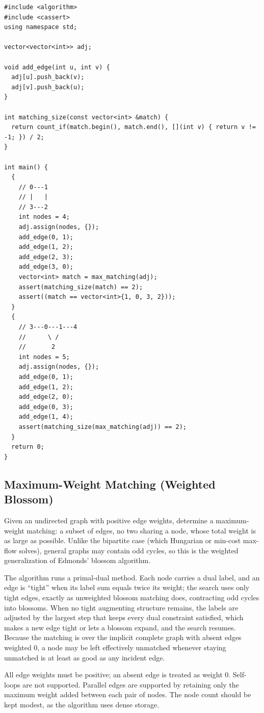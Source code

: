 \begin{lstlisting}[style=cpp]
#include <algorithm>
#include <cassert>
using namespace std;

vector<vector<int>> adj;

void add_edge(int u, int v) {
  adj[u].push_back(v);
  adj[v].push_back(u);
}

int matching_size(const vector<int> &match) {
  return count_if(match.begin(), match.end(), [](int v) { return v != -1; }) / 2;
}

int main() {
  {
    // 0---1
    // |   |
    // 3---2
    int nodes = 4;
    adj.assign(nodes, {});
    add_edge(0, 1);
    add_edge(1, 2);
    add_edge(2, 3);
    add_edge(3, 0);
    vector<int> match = max_matching(adj);
    assert(matching_size(match) == 2);
    assert((match == vector<int>{1, 0, 3, 2}));
  }
  {
    // 3---0---1---4
    //      \ /
    //       2
    int nodes = 5;
    adj.assign(nodes, {});
    add_edge(0, 1);
    add_edge(1, 2);
    add_edge(2, 0);
    add_edge(0, 3);
    add_edge(1, 4);
    assert(matching_size(max_matching(adj)) == 2);
  }
  return 0;
}
\end{lstlisting}
\subsection{Maximum-Weight Matching (Weighted Blossom)}
\label{sec:4.6.6}
Given an undirected graph with positive edge weights, determine a maximum-weight matching: a subset of edges, no two sharing a node, whose total weight is as large as possible. Unlike the bipartite case (which Hungarian or min-cost max-flow solves), general graphs may contain odd cycles, so this is the weighted generalization of Edmonds' blossom algorithm.

The algorithm runs a primal-dual method. Each node carries a dual label, and an edge is ``tight'' when its label sum equals twice its weight; the search uses only tight edges, exactly as unweighted blossom matching does, contracting odd cycles into blossoms. When no tight augmenting structure remains, the labels are adjusted by the largest step that keeps every dual constraint satisfied, which makes a new edge tight or lets a blossom expand, and the search resumes. Because the matching is over the implicit complete graph with absent edges weighted 0, a node may be left effectively unmatched whenever staying unmatched is at least as good as any incident edge.

All edge weights must be positive; an absent edge is treated as weight 0. Self-loops are not supported. Parallel edges are supported by retaining only the maximum weight added between each pair of nodes. The node count should be kept modest, as the algorithm uses dense storage.

